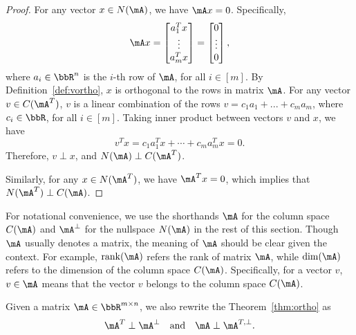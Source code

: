 \documentclass[11pt]{article}
\DeclareMathOperator{\rank}{rank}
\theoremstyle{plain}
\theoremstyle{definition}
\begin{document}
\begin{proof}
	For any vector $x \in N(\mA)$, we have $\mA x = 0$. Specifically,
	\begin{align}
		\mA x  = \begin{bmatrix}
			a_1^T x \\ \vdots \\ a_m^T x 
		\end{bmatrix} = \begin{bmatrix}
			0\\ \vdots \\0
		\end{bmatrix},
	\end{align}
	where $a_i \in \bbR^n$ is the $i$-th  row of $\mA$, for all $ i \in [m]$. By Definition~\ref{def:vortho}, $x$ is orthogonal to the rows in matrix $\mA$. For any vector $v \in C(\mA^T)$, $v$ is a linear combination of the rows $v = c_1 a_1 + ...+c_m a_m$, where $c_i \in \bbR$, for all $i\in [m]$. Taking inner product between vectors $v$ and $x$, we have
	\[  v^T x =  c_1 a_1^T x + \cdots + c_m a_m^T x = 0.  \]
	Therefore, $v \perp x$, and $N(\mA) \perp C(\mA^T)$.
	
	Similarly, for any $x \in N(\mA^T)$, we have $\mA^T x = 0$, which implies  that $N(\mA^T) \perp C(\mA)$. 
\end{proof}

For notational convenience, we use the shorthands $\mA$ for the column space $C(\mA)$ and $\mA^{\perp}$ for the nullspace $N(\mA)$ in the rest of this section. Though $\mA$ usually denotes a matrix, the meaning of $\mA$ should be clear given the context. For example, $\rank(\mA)$ refers the rank of matrix $\mA$, while $\dim(\mA)$ refers to the dimension of the column space $C(\mA)$. Specifically, for a vector $v$, $v \in \mA$ means that the vector $v$ belongs to the column space $C(\mA)$.
 
\vspace{0.2cm}
Given a matrix $\mA \in \bbR^{m \times n}$, we also rewrite the Theorem~\ref{thm:ortho} as
\[ \mA^T \perp \mA^{\perp} \quad \text{and} \quad \mA \perp \mA^{T,\perp}. \]
\end{document}
